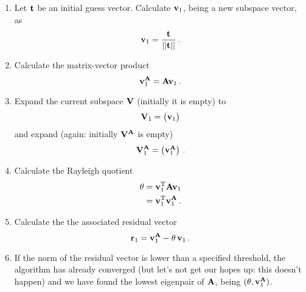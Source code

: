         \begin{enumerate}
            \item Let $\vb{t}$ be an initial guess vector. Calculate $\vb{v}_1$, being a new subspace vector, as
                \begin{equation}
                    \vb{v}_1 = \frac{\vb{t}}{|| \vb{t} ||} \thinspace .
                \end{equation}

            \item Calculate the matrix-vector product
                \begin{equation}
                    \vb{v}^{\vb{A}}_1 = \vb{A} \vb{v}_1 \thinspace .
                \end{equation}

            \item Expand the current subspace $\vb{V}$ (initially it is empty) to
                \begin{equation}
                    \vb{V}_1 = \begin{pmatrix} \vb{v}_1 \end{pmatrix}
                \end{equation}
                and expand (again: initially $\vb{V}^{\vb{A}}$ is empty)
                \begin{equation}
                    \vb{V}^{\vb{A}}_1 = \begin{pmatrix} \vb{v}^{\vb{A}}_1 \end{pmatrix} \thinspace .
                \end{equation}

            \item Calculate the Rayleigh quotient
                \begin{align}
                    \theta &= \vb{v}^{\text{T}}_1 \vb{A} \vb{v}_1 \\
                    &= \vb{v}^{\text{T}}_1 \vb{v}^{\vb{A}}_1 \thinspace .
                \end{align}

            \item Calculate the the associated residual vector
                \begin{equation}
                    \vb{r}_1 = \vb{v}^{\vb{A}}_1 - \theta \thinspace \vb{v}_1 \thinspace .
                \end{equation}

            \item If the norm of the residual vector is lower than a specified threshold, the algorithm has already converged (but let's not get our hopes up: this doesn't happen) and we have found the lowest eigenpair of $\vb{A}$, being $(\theta, \vb{v}_1^{\vb{A}})$.


\end{enumerate}
